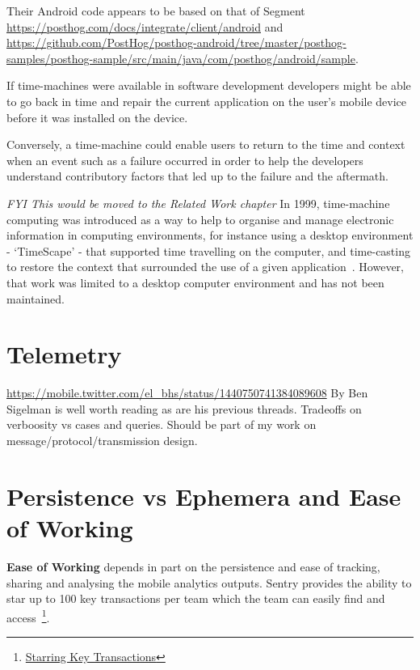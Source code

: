 Their Android code appears to be based on that of Segment \url{https://posthog.com/docs/integrate/client/android} and \url{https://github.com/PostHog/posthog-android/tree/master/posthog-samples/posthog-sample/src/main/java/com/posthog/android/sample}.

If time-machines were available in software development developers might be able to go back in time and repair the current application on the user's mobile device before it was installed on the device. 

Conversely, a time-machine could enable users to return to the time and context when an event such as a failure occurred in order to help the developers understand contributory factors that led up to the failure and the aftermath. 

\textit{FYI This would be moved to the Related Work chapter}
In 1999, time-machine computing was introduced as a way to help to organise and manage electronic information in computing environments, for instance using a desktop environment - `TimeScape' - that supported time travelling on the computer, and time-casting to restore the context that surrounded the use of a given application~\citep{rekimoto1999_time_machine_computing}. However, that work was limited to a desktop computer environment and has not been maintained. 

\section{Telemetry}
\url{https://mobile.twitter.com/el_bhs/status/1440750741384089608} By Ben Sigelman is well worth reading as are his previous threads. Tradeoffs on verboosity vs cases and queries. Should be part of my work on message/protocol/transmission design.

\section{Persistence vs Ephemera and Ease of Working}
\textbf{Ease of Working} depends in part on the persistence and ease of tracking, sharing and analysing the mobile analytics outputs. Sentry provides the ability to star up to 100 key transactions per team which the team can easily find and access~\footnote{\href{https://docs.sentry.io/product/performance/transaction-summary/\#starring-key-transactions}{Starring Key Transactions}}.